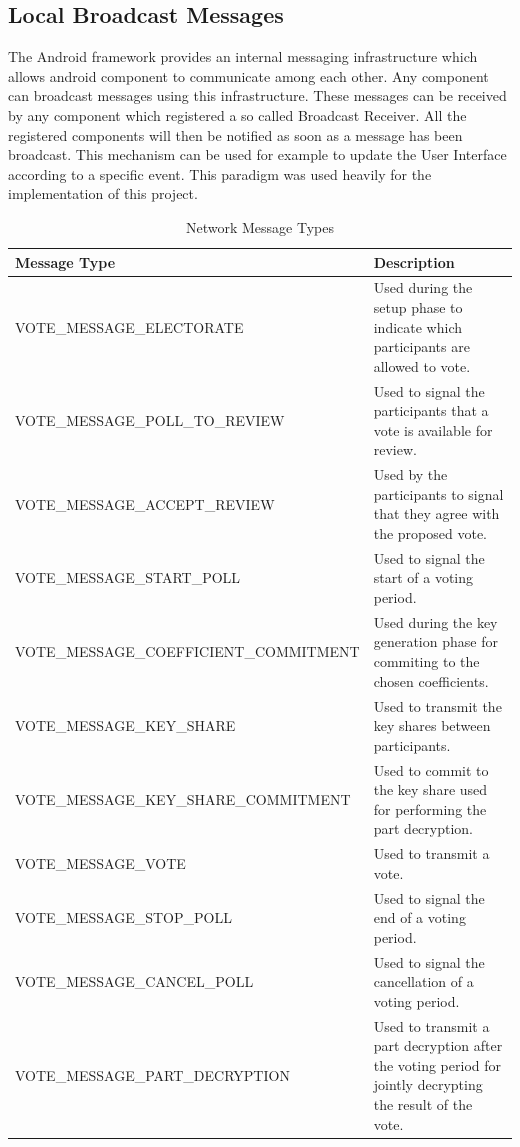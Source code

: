 \documentclass[numbers=noenddot, abstract=on, a4paper, headsepline,
footsepline, oneside, draft=off]{scrreprt}
\begin{document}
\subsection{Local Broadcast Messages}
The Android framework provides an internal messaging infrastructure which allows
android component to communicate among each other. Any component can broadcast
messages using this infrastructure. These messages can be received by any
component which registered a so called Broadcast Receiver. All the registered
components will then be notified as soon as a message has been broadcast. This
mechanism can be used for example to update the User Interface according to a
specific event.
This paradigm was used heavily for the implementation of this project.


\begin{table}[htbp]
	\centering
	\renewcommand{\arraystretch}{1.4}
	\begin{minipage}{\linewidth}
	\begin{tabularx}{\textwidth}{lX}
		\toprule
		\textbf{Message Type}					& 	\textbf{Description}			\\
		\midrule
		VOTE\_MESSAGE\_ELECTORATE					& 	Used during the setup phase to
														indicate which participants are allowed to vote.\\
		VOTE\_MESSAGE\_POLL\_TO\_REVIEW				& 	Used to signal the participants that a
														vote is available for review.\\
		VOTE\_MESSAGE\_ACCEPT\_REVIEW				& 	Used by the participants to signal that
														they agree with the proposed vote.\\
		VOTE\_MESSAGE\_START\_POLL					& 	Used to signal the start of a voting
														period. \\
		VOTE\_MESSAGE\_COEFFICIENT\_COMMITMENT		& 	Used during the key generation
														phase for commiting to the chosen coefficients.\\
		VOTE\_MESSAGE\_KEY\_SHARE					& 	Used to transmit the key shares between
														participants.\\
		VOTE\_MESSAGE\_KEY\_SHARE\_COMMITMENT		& 	Used to commit to the key share
														used for performing the part decryption.\\
		VOTE\_MESSAGE\_VOTE							& 	Used to transmit a vote.	\\

		VOTE\_MESSAGE\_STOP\_POLL					& 	Used to signal the end of a voting period.\\
		VOTE\_MESSAGE\_CANCEL\_POLL					& 	Used to signal the cancellation of a
														voting period.\\
		VOTE\_MESSAGE\_PART\_DECRYPTION				& 	Used to transmit a part decryption
														after the voting period for jointly decrypting the result of the
														vote.\\
		

		\bottomrule
	\end{tabularx}
	\end{minipage}
	\renewcommand{\arraystretch}{1}
	\caption{Network Message Types}
	\label{tab:networkmessagetypes}
\end{table}
\end{document}
